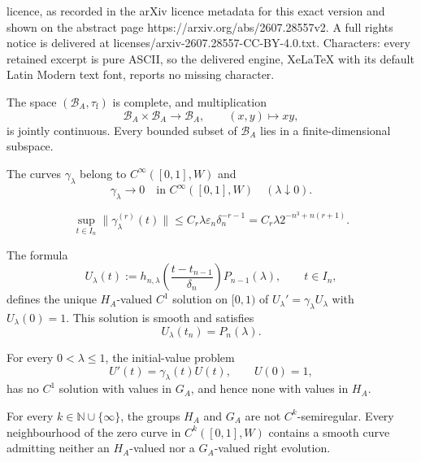 \documentclass[10pt,a4paper]{amsart}
\begin{document}
licence, as recorded in the arXiv licence metadata for this exact version and shown on the abstract page https://arxiv.org/abs/2607.28557v2. A full rights notice is delivered at licenses/arxiv-2607.28557-CC-BY-4.0.txt. Characters: every retained excerpt is pure ASCII, so the delivered engine, XeLaTeX with its default Latin Modern text font, reports no missing character.
\begin{proposition}
\label{prop:topological-algebra}
The space $(\mathcal B_A,\tau_{\mathrm f})$ is complete, and multiplication
\[
  \mathcal B_A\times\mathcal B_A\to\mathcal B_A,
  \qquad (x,y)\mapsto xy,
\]
is jointly continuous.  Every bounded subset of $\mathcal B_A$ lies in a
finite-dimensional subspace.
\end{proposition}

\begin{lemma}
\label{lem:smooth-pulses}
The curves $\gamma_\lambda$ belong to $C^\infty([0,1],W)$ and
\[
  \gamma_\lambda\longrightarrow0
  \quad\text{in }C^\infty([0,1],W)
  \quad(\lambda\downarrow0).
\]
\end{lemma}

\begin{equation}
  \sup_{t\in I_n}\|\gamma_\lambda^{(r)}(t)\|
  \leq C_r\lambda\varepsilon_n\delta_n^{-r-1}
  =C_r\lambda 2^{-n^3+n(r+1)}.
  \label{eq:pulse-derivative-estimate}
\end{equation}

\begin{proposition}
\label{prop:local-evolution}
The formula
\begin{equation}
  U_\lambda(t):=
  h_{n,\lambda}\left(\frac{t-t_{n-1}}{\delta_n}\right)
  P_{n-1}(\lambda),
  \qquad t\in I_n,
  \label{eq:local-evolution}
\end{equation}
defines the unique $H_A$-valued $C^1$ solution on $[0,1)$ of
$U_\lambda'=\gamma_\lambda U_\lambda$ with $U_\lambda(0)=1$.  This
solution is smooth and satisfies
\[
  U_\lambda(t_n)=P_n(\lambda).
\]
\end{proposition}

\begin{theorem}
\label{thm:no-evolution}
For every $0<\lambda\leq1$, the initial-value problem
\[
  U'(t)=\gamma_\lambda(t)U(t),
  \qquad U(0)=1,
\]
has no $C^1$ solution with values in $G_A$, and hence none with values in
$H_A$.
\end{theorem}

\begin{corollary}
\label{cor:all-k}
For every $k\in\mathbb N\cup\{\infty\}$, the groups $H_A$ and $G_A$ are
not $C^k$-semiregular.  Every neighbourhood of the zero curve in
$C^k([0,1],W)$ contains a smooth curve admitting neither an $H_A$-valued nor
a $G_A$-valued right evolution.
\end{corollary}
\end{document}
